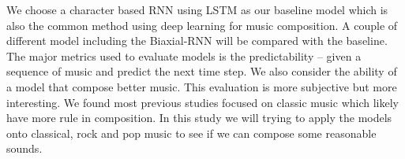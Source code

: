 \documentclass[10pt,journal]{IEEEtran}
\begin{document}
We choose a character based RNN using LSTM as our baseline model which is also the common method using deep learning for music composition.
A couple of different model including the Biaxial-RNN will be compared with the baseline.
The major metrics used to evaluate models is the predictability – given a sequence of music and predict the next time step.
We also consider the ability of a model that compose better music. This evaluation is more subjective but more interesting.
We found most previous studies focused on classic music which likely have more rule in composition.
In this study we will trying to apply the models onto classical, rock and pop music to see if we can compose some reasonable sounds.


\end{document}
